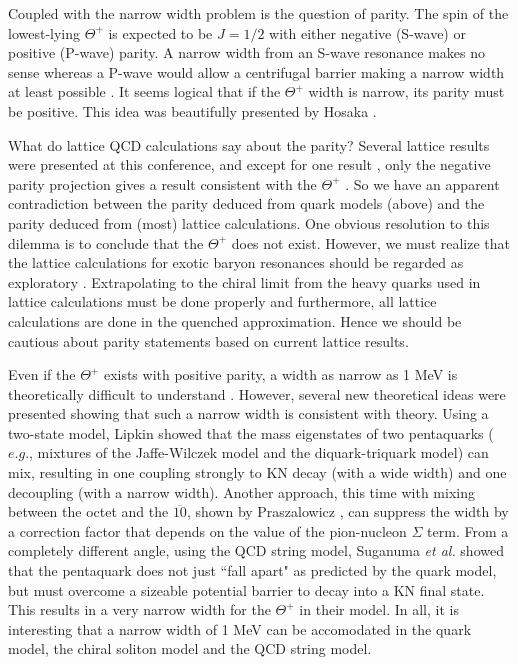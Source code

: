 \documentclass{ws-procs9x6}
\newcommand{\thp}{$\Theta^+$ }
\begin{document}
Coupled with the narrow width problem is the 
question of parity.  The spin of the lowest-lying \thp 
is expected to be $J=1/2$ with either negative (S-wave) or 
positive (P-wave) parity. A narrow width from an S-wave 
resonance makes no sense \cite{jw} whereas a P-wave 
would allow a centrifugal barrier making a narrow width 
at least possible \cite{jw,kl}.  It seems logical that 
if the \thp width is narrow, its parity must be positive. 
This idea was beautifully presented by Hosaka \cite{hosaka}.

What do lattice QCD calculations say about the parity?  
Several lattice results were presented at this conference, 
and except for one result \cite{chiu}, only the negative 
parity projection gives a result consistent with the \thp 
\cite{sasaki,lee}.
So we have an apparent contradiction between the parity 
deduced from quark models (above) and the parity deduced from 
(most) lattice calculations.  One obvious resolution to this 
dilemma is to conclude that the \thp does not exist. However, 
we must realize that the lattice calculations for exotic 
baryon resonances should be regarded as exploratory \cite{sasaki}. 
Extrapolating to the chiral limit from the heavy quarks 
used in lattice calculations must be done properly \cite{chiu,lee} 
and furthermore, all lattice calculations are done in the 
quenched approximation.  Hence we should be cautious about 
parity statements based on current lattice results.

Even if the \thp exists with positive parity, a width as 
narrow as 1 MeV is theoretically difficult to understand 
\cite{prasz}.  However, several new theoretical ideas 
were presented showing that such a narrow width is consistent 
with theory.  Using a two-state model, Lipkin showed \cite{lipkin} 
that the mass eigenstates of two pentaquarks ($e.g.$, mixtures 
of the Jaffe-Wilczek model and the diquark-triquark model) 
can mix, resulting in one coupling strongly to KN decay 
(with a wide width) and one decoupling (with a narrow width). 
Another approach, this time with mixing between the octet 
and the $\overline{10}$, shown by Praszalowicz \cite{prasz}, 
can suppress the width by a correction factor that depends 
on the value of the pion-nucleon $\Sigma$ term.  From a 
completely different angle, using the QCD string model, 
Suganuma {\it et al.} showed \cite{suganuma} that the 
pentaquark does not just ``fall apart" as predicted by the 
quark model, but must overcome a sizeable potential barrier 
to decay into a KN final state.  This results in a very 
narrow width for the \thp in their model.  In all, it is 
interesting that a narrow width of 1 MeV can be accomodated 
in the quark model, the chiral soliton model and the QCD 
string model.
\end{document}
